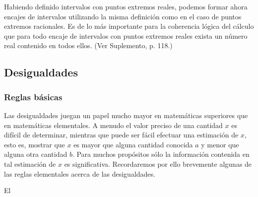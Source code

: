 \documentclass[12pt]{book}
\theoremstyle{definition}
\begin{document}
Habiendo definido intervalos con puntos extremos reales, podemos formar ahora encajes de intervalos utilizando la misma definición como en el caso de puntos extremos racionales. Es de lo más importante para la coherencia lógica del cálculo que para todo encaje de intervalos con puntos extremos reales exista un número real contenido en todos ellos. (Ver Suplemento, p. 118.)

\subsection{Desigualdades}

\subsubsection{Reglas básicas}

Las desigualdades juegan un papel mucho mayor en matemáticas superiores que en matemáticas elementales. A menudo el valor preciso de una cantidad $x$ es difícil de determinar, mientras que puede ser fácil efectuar una estimación de $x$, esto es, mostrar que $x$ es mayor que alguna cantidad conocida $a$ y menor que alguna otra cantidad $b$. Para muchos propósitos sólo la información contenida en tal estimación de $x$ es significativa. Recordaremos por ello brevemente algunas de las reglas elementales acerca de las desigualdades.

El
\end{document}
